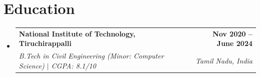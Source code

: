 \documentclass[letterpaper,11pt]{article}
\makeatletter
\newcommand{\resumeSubheading}[4]{
  \vspace{-2pt}\item
    \begin{tabular*}{1.0\textwidth}[t]{l@{\extracolsep{\fill}}r}
      \textbf{#1} & \textbf{\small #2} \\
      \textit{\small#3} & \textit{\small #4} \\
    \end{tabular*}\vspace{-8pt}
}
\newcommand{\resumeSubHeadingListStart}{\begin{itemize}[leftmargin=0.0in, label={}]}
\newcommand{\resumeSubHeadingListEnd}{\end{itemize}}
\makeatother
\begin{document}
\section{Education}
  \resumeSubHeadingListStart
    \resumeSubheading
      {National Institute of Technology, Tiruchirappalli}{Nov 2020 -- June 2024}
      {B.Tech in Civil Engineering (Minor: Computer Science) $|$ CGPA: 8.1/10}{Tamil Nadu, India}
  \resumeSubHeadingListEnd
\end{document}
